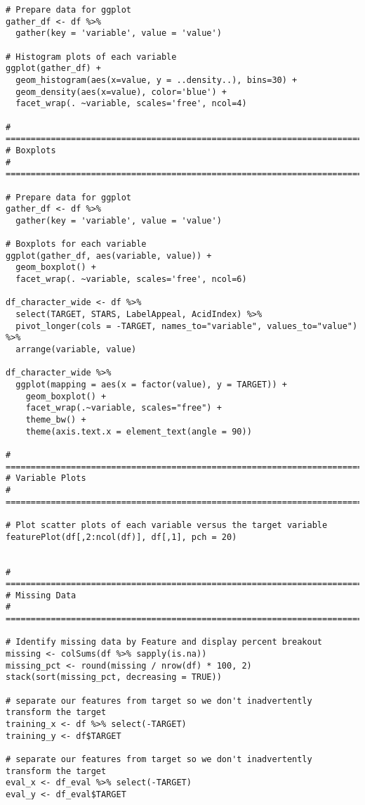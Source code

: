 \documentclass[
]{article}
\begin{document}
\begin{verbatim}
# Prepare data for ggplot
gather_df <- df %>% 
  gather(key = 'variable', value = 'value')

# Histogram plots of each variable
ggplot(gather_df) + 
  geom_histogram(aes(x=value, y = ..density..), bins=30) + 
  geom_density(aes(x=value), color='blue') +
  facet_wrap(. ~variable, scales='free', ncol=4)
     
# =====================================================================================
# Boxplots 
# =====================================================================================

# Prepare data for ggplot
gather_df <- df %>% 
  gather(key = 'variable', value = 'value')

# Boxplots for each variable
ggplot(gather_df, aes(variable, value)) + 
  geom_boxplot() + 
  facet_wrap(. ~variable, scales='free', ncol=6)
  
df_character_wide <- df %>% 
  select(TARGET, STARS, LabelAppeal, AcidIndex) %>%
  pivot_longer(cols = -TARGET, names_to="variable", values_to="value") %>%
  arrange(variable, value)

df_character_wide %>% 
  ggplot(mapping = aes(x = factor(value), y = TARGET)) +
    geom_boxplot() + 
    facet_wrap(.~variable, scales="free") +
    theme_bw() +
    theme(axis.text.x = element_text(angle = 90))

# =====================================================================================
# Variable Plots
# =====================================================================================
  
# Plot scatter plots of each variable versus the target variable
featurePlot(df[,2:ncol(df)], df[,1], pch = 20)


# =====================================================================================
# Missing Data 
# =====================================================================================

# Identify missing data by Feature and display percent breakout
missing <- colSums(df %>% sapply(is.na))
missing_pct <- round(missing / nrow(df) * 100, 2)
stack(sort(missing_pct, decreasing = TRUE))

# separate our features from target so we don't inadvertently transform the target
training_x <- df %>% select(-TARGET)
training_y <- df$TARGET

# separate our features from target so we don't inadvertently transform the target
eval_x <- df_eval %>% select(-TARGET)
eval_y <- df_eval$TARGET


\end{verbatim}
\end{document}

